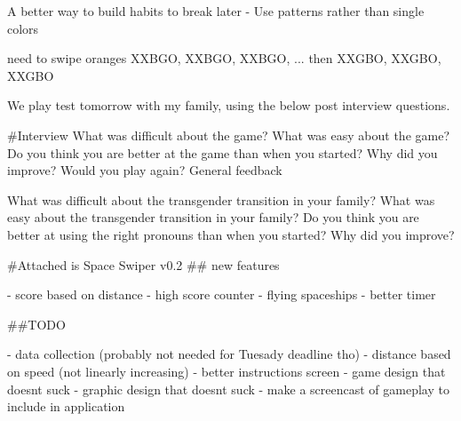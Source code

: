 A better way to build habits to break later - Use patterns rather than single colors

need to swipe oranges
XXBGO, XXBGO, XXBGO, ... then XXGBO, XXGBO, XXGBO

We play test tomorrow with my family, using the below post interview questions.

#Interview
What was difficult about the game?
What was easy about the game?
Do you think you are better at the game than when you started?
Why did you improve?
Would you play again?
General feedback

What was difficult about the transgender transition in your family?
What was easy about the transgender transition in your family?
Do you think you are better at using the right pronouns than when you started?
Why did you improve?


#Attached is Space Swiper v0.2
## new features

- score based on distance
- high score counter
- flying spaceships
- better timer

##TODO

- data collection (probably not needed for Tuesady deadline tho)
- distance based on speed (not linearly increasing)
- better instructions screen
- game design that doesnt suck
- graphic design that doesnt suck
- make a screencast of gameplay to include in application
